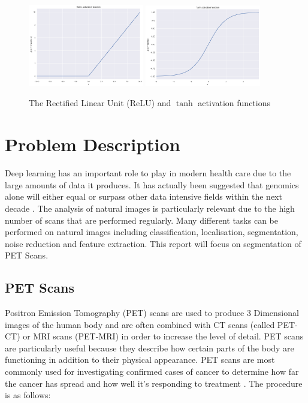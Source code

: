 \begin{figure}[hbtp!]
    \centering
    \includegraphics[width=0.45\textwidth]{./img/ReLU.png}
    \includegraphics[width=0.45\textwidth]{./img/tanh.png}
    \caption{The Rectified Linear Unit (ReLU) and $\tanh$ activation functions}
    \label{fig:ReLU_tanh}
\end{figure}


\section{Problem Description}\label{sec:problem_description_int}

Deep learning has an important role to play in modern health care due to the large amounts of data it produces.
It has actually been suggested that genomics alone will either equal or surpass other data intensive fields within the next decade \cite{Stephens_Lee_Faghri_Campbell_Zhai_Efron_Iyer_Schatz_Sinha_Robinson_2015}.
The analysis of natural images is particularly relevant due to the high number of scans that are performed regularly.
Many different tasks can be performed on natural images including classification, localisation, segmentation, noise reduction and feature extraction.
This report will focus on segmentation of PET Scans.

\subsection{PET Scans}\label{subsec:pet_scan_int}
Positron Emission Tomography (PET) scans are used to produce 3 Dimensional images of the human body and are often combined with CT scans (called PET-CT) or MRI scans (PET-MRI) in order to increase the level of detail.
PET scans are particularly useful because they describe how certain parts of the body are functioning in addition to their physical appearance.
PET scans are most commonly used for investigating confirmed cases of cancer to determine how far the cancer has spread and how well it's responding to treatment \cite{Radiology_ACR, PET_scan}.
The procedure is as follows:

